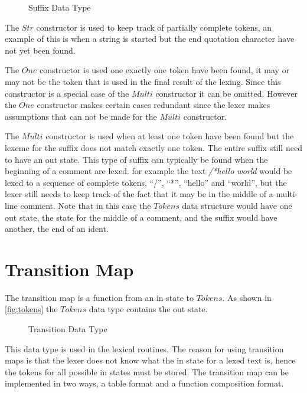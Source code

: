 \begin{figure}[h!]
  
  \caption{Suffix Data Type\label{fig:suff}}
\end{figure}

The $Str$ constructor is used to keep track of partially complete tokens, an
example of this is when a string is started but the end quotation character have
not yet been found.

The $One$ constructor is used one exactly one token have been found, it may or
may not be the token that is used in the final result of the lexing. Since this
constructor is a special case of the $Multi$ constructor it can be omitted.
However the $One$ constructor makes certain cases redundant since the lexer
makes assumptions that can not be made for the $Multi$ constructor.

The $Multi$ constructor is used when at least one token have been found but the
lexeme for the suffix does not match exactly one token. The entire suffix still
need to have an out state. This type of suffix can typically be found when
the beginning of a comment are lexed. for example the text \emph{/*hello world}
would be lexed to a sequence of complete tokens, ``/'', ``*'', ``hello'' and
``world'', but the lexer still needs to keep track of the fact that it may be in
the middle of a multi-line comment. Note that in this case the $Tokens$ data
structure would have one out state, the state for the middle of a comment, and
the suffix would have another, the end of an ident.

\section{Transition Map}
The transition map is a function from an in state to $Tokens$. As shown in
\cref{fig:tokens} the $Tokens$ data type contains the out state.

\begin{figure}[h!]
  
  \caption{Transition Data Type \label{fig:transition}}
\end{figure}

This data type is used in the lexical routines. The reason for using transition
maps is that the lexer does not know what the in state for a lexed text is, hence
the tokens for all possible in states must be stored. The transition map can be
implemented in two ways, a table format and a function composition format.

